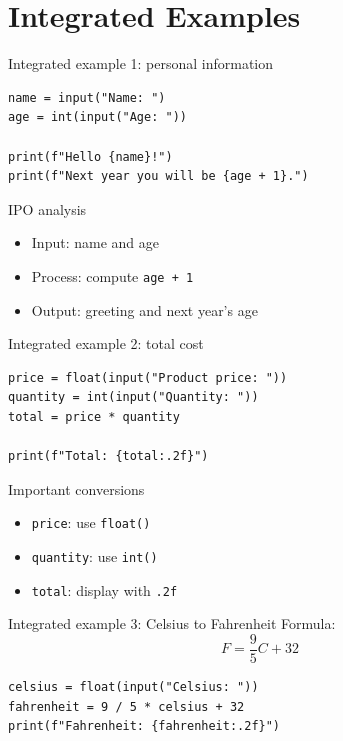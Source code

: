 \documentclass[aspectratio=169,10pt]{beamer}
\begin{document}
\section{Integrated Examples}

\begin{frame}[fragile]{Integrated example 1: personal information}
\begin{lstlisting}
name = input("Name: ")
age = int(input("Age: "))

print(f"Hello {name}!")
print(f"Next year you will be {age + 1}.")
\end{lstlisting}
\begin{block}{IPO analysis}
\begin{itemize}
  \item Input: name and age
  \item Process: compute \texttt{age + 1}
  \item Output: greeting and next year's age
\end{itemize}
\end{block}
\end{frame}

\begin{frame}[fragile]{Integrated example 2: total cost}
\begin{lstlisting}
price = float(input("Product price: "))
quantity = int(input("Quantity: "))
total = price * quantity

print(f"Total: {total:.2f}")
\end{lstlisting}
\begin{block}{Important conversions}
\begin{itemize}
  \item \texttt{price}: use \texttt{float()}
  \item \texttt{quantity}: use \texttt{int()}
  \item \texttt{total}: display with \texttt{.2f}
\end{itemize}
\end{block}
\end{frame}

\begin{frame}[fragile]{Integrated example 3: Celsius to Fahrenheit}
Formula:
\[
F = \frac{9}{5}C + 32
\]
\begin{lstlisting}
celsius = float(input("Celsius: "))
fahrenheit = 9 / 5 * celsius + 32
print(f"Fahrenheit: {fahrenheit:.2f}")
\end{lstlisting}
\end{frame}
\end{document}
